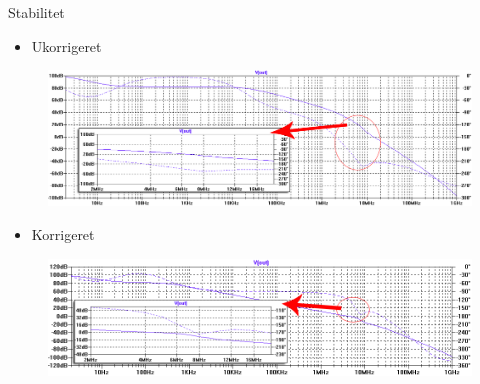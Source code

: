 

\begin{frame}{Stabilitet}

\begin{itemize}
\item Ukorrigeret
\end{itemize}
\begin{figure}[h]
\centering
\includegraphics[width=\textwidth]{images/stabilitet-udenc-graf.png}
\end{figure}

\begin{itemize}
\item Korrigeret
\end{itemize}
\begin{figure}[h]
\centering
\includegraphics[width=\textwidth]{images/stabilitet-medc-graf.png}
\end{figure}

\end{frame}


